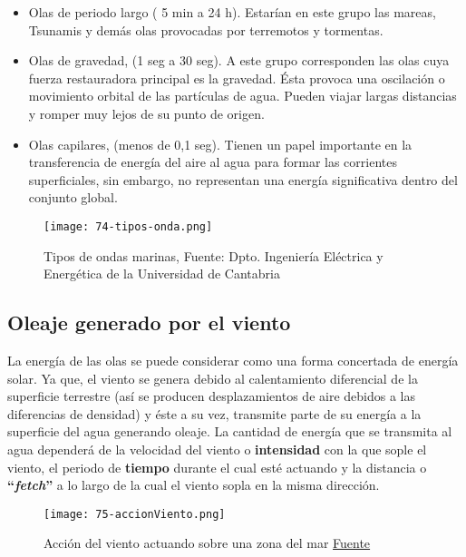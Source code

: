 \begin{itemize}
  \begin{itemize}
  \item
    Olas de periodo largo ( 5 min a 24 h). Estarían en este grupo las
    mareas, Tsunamis y demás olas provocadas por terremotos y tormentas.
  \item
    Olas de gravedad, (1 seg a 30 seg). A este grupo corresponden las
    olas cuya fuerza restauradora principal es la gravedad. Ésta provoca
    una oscilación o movimiento orbital de las partículas de agua.
    Pueden viajar largas distancias y romper muy lejos de su punto de
    origen.
  \item
    Olas capilares, (menos de 0,1 seg). Tienen un papel importante en la
    transferencia de energía del aire al agua para formar las corrientes
    superficiales, sin embargo, no representan una energía significativa
    dentro del conjunto global.
  \end{itemize}
\end{itemize}

\begin{figure}
\centering
\texttt{[image: 74-tipos-onda.png]}
\caption[Tipos de ondas marinas]{Tipos de ondas marinas, Fuente: Dpto. Ingeniería
Eléctrica y Energética de la Universidad de Cantabria}
\end{figure}



\subsection{Oleaje generado por el viento}\label{header-n126}

La energía de las olas se puede considerar como una forma concertada de
energía solar. Ya que, el viento se genera debido al calentamiento
diferencial de la superficie terrestre (así se producen desplazamientos
de aire debidos a las diferencias de densidad) y éste a su vez,
transmite parte de su energía a la superficie del agua generando oleaje.
La cantidad de energía que se transmita al agua dependerá de la
velocidad del viento o \textbf{intensidad} con la que sople el viento,
el periodo de \textbf{tiempo} durante el cual esté actuando y la
distancia o \textbf{``\emph{fetch}''} a lo largo de la cual el viento
sopla en la misma dirección.

\begin{figure}
\centering
\texttt{[image: 75-accionViento.png]}
\caption[Acción del viento]{Acción del viento actuando sobre una zona del mar \href{http://es.pfernandezdiez.es/index.php?pageID=15}{Fuente}}
\end{figure}



